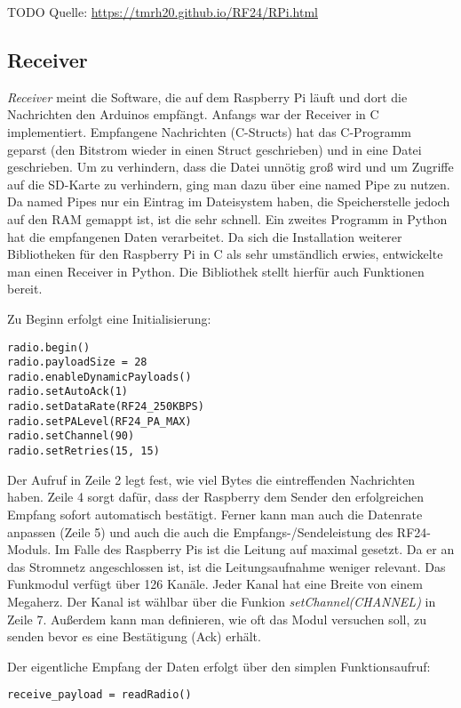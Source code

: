 TODO Quelle: \url{https://tmrh20.github.io/RF24/RPi.html}

\subsection{Receiver}
\textit{Receiver} meint die Software, die auf dem Raspberry Pi läuft und dort die Nachrichten den Arduinos empfängt. Anfangs war der Receiver in C implementiert. Empfangene Nachrichten (C-Structs) hat das C-Programm geparst (den Bitstrom wieder in einen Struct geschrieben) und in eine Datei geschrieben. Um zu verhindern, dass die Datei unnötig groß wird und um Zugriffe auf die SD-Karte zu verhindern, ging man dazu über eine named Pipe zu nutzen. Da named Pipes nur ein Eintrag im Dateisystem haben, die Speicherstelle jedoch auf den RAM gemappt ist, ist die sehr schnell. Ein zweites Programm in Python hat die empfangenen Daten verarbeitet. 
Da sich die Installation weiterer Bibliotheken für den Raspberry Pi in C als sehr umständlich erwies, entwickelte man einen Receiver in Python. Die Bibliothek stellt hierfür auch Funktionen bereit. 

Zu Beginn erfolgt eine Initialisierung:
\lstset{language=python, numbers=left}
\begin{lstlisting}
radio.begin()
radio.payloadSize = 28
radio.enableDynamicPayloads()
radio.setAutoAck(1)
radio.setDataRate(RF24_250KBPS)
radio.setPALevel(RF24_PA_MAX)
radio.setChannel(90)
radio.setRetries(15, 15)
\end{lstlisting}
Der Aufruf in Zeile 2 legt fest, wie viel Bytes die eintreffenden Nachrichten haben. Zeile 4 sorgt dafür, dass der Raspberry dem Sender den erfolgreichen Empfang sofort automatisch bestätigt. Ferner kann man auch die Datenrate anpassen (Zeile 5) und auch die auch die Empfangs-/Sendeleistung des RF24-Moduls. Im Falle des Raspberry Pis ist die Leitung auf maximal gesetzt. Da er an das Stromnetz angeschlossen ist, ist die Leitungsaufnahme weniger relevant. Das Funkmodul verfügt über 126 Kanäle. Jeder Kanal hat eine Breite von einem Megaherz. Der Kanal ist wählbar über die Funkion \textit{setChannel(CHANNEL)} in Zeile 7. Außerdem kann man definieren, wie oft das Modul versuchen soll, zu senden bevor es eine Bestätigung (Ack) erhält.

Der eigentliche Empfang der Daten erfolgt über den simplen Funktionsaufruf:
\lstset{language=python, numbers=none}
\begin{lstlisting}
receive_payload = readRadio()
\end{lstlisting}



